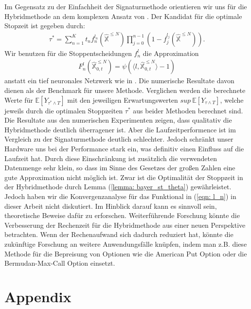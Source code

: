 \documentclass[12pt,titlepage,headsepline]{article}
\begin{document}
      \hfill\break
      Im Gegensatz zu der Einfachheit der Signaturmethode orientieren wir uns für die Hybridmethode an dem komplexen Ansatz von \cite{becker_deep_2019}. Der Kandidat für die optimale Stopzeit ist gegeben durch:
      \begin{align*}
        \tau^* = \sum_{n=1}^K t_nf_n^{l_n}(\hat{\mathbb{X}}^{\leq N})\prod_{j=0}^{n-1}(1-f_j^{l_j}(\hat{\mathbb{X}}^{\leq N})).
      \end{align*}
      Wir benutzen für die Stoppentscheidungen $f_n^l$ die Approximation
      \begin{align*}
        F_n^l(\hat{\mathbb{X}}_{0,t}^{\leq N}) = \psi(\langle l, \hat{\mathbb{X}}_{0,t}^{\leq N} \rangle - 1)
      \end{align*}
      anstatt ein tief neuronales Netzwerk wie in \cite{becker_deep_2019}.
      \hfill\break
      Die numerische Resultate davon dienen als der Benchmark für unsere Methode. Verglichen werden die berechnete Werte für $\mathbb{E}[Y_{\tau^* \wedge T}]$ mit den jeweiligen Erwartungswerten $sup \ \mathbb{E}[Y_{\tau \wedge T}]$, welche jeweils durch die optimalen Stoppzeiten $\tau^*$ aus beider Methoden berechnet sind. Die Resultate aus den numerischen Experimenten zeigen, dass qualitativ die Hybridmethode deutlich überragener ist. Aber die Laufzeitperformence ist im Vergleich zu der Signaturmethode deutlich schlechter. Jedoch schränkt unser Hardware uns bei der Performance stark ein, was definitiv einen Einfluss auf die Laufzeit hat. Durch diese Einschränkung ist zusätzlich die verwendeten Datenmenge sehr klein, so dass im Sinne des Gesetzes der großen Zahlen eine gute Approximation nicht möglich ist.
      \hfill\break
      Zwar ist die Optimalität der Stoppzeit in der Hybridmethode durch Lemma (\ref{lemma: bayer_st_theta}) gewährleistet. Jedoch haben wir die Konvergenzanalyse für das Funktional in (\ref{eqn: l_n}) in dieser Arbeit nicht diskutiert. Im Hinblick darauf kann es sinnvoll sein, theoretische Beweise dafür zu erforschen. Weiterführende Forschung könnte die Verbesserung der Rechenzeit für die Hybridmethode aus einer neuen Perspektive betrachten. Wenn der Rechenaufwand sich dadurch reduziert hat, könnte die zukünftige Forschung an weitere Anwendungsfälle knüpfen, indem man z.B. diese Methode für die Bepreisung von Optionen wie die American Put Option oder die Bermudan-Max-Call Option einsetzt.
    \printbibliography

    \newpage

    \appendix

    \section{Appendix}
\end{document}
